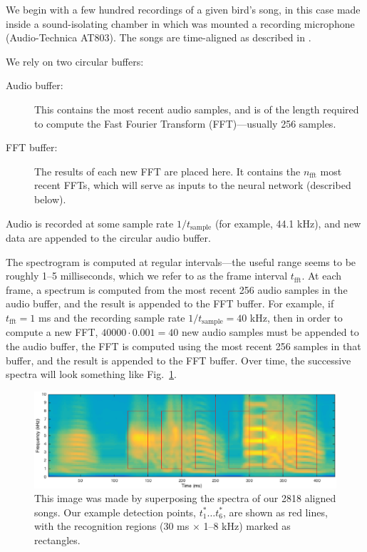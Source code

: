 \documentclass[10pt,letterpaper]{article}
\newcommand\fig[1]{Fig.~\ref{#1}}
\begin{document}
We begin with a few hundred recordings of a given bird's song, in this
case made inside a sound-isolating chamber in which was mounted a
recording microphone (Audio-Technica AT803).  The songs are
time-aligned as described in \cite{Poole2012}.

We rely on two circular buffers:
\begin{description}
\item[Audio buffer:] This contains the most recent audio samples, and
  is of the length required to compute the Fast Fourier Transform
  (FFT)---usually 256 samples.
\item[FFT buffer:] The results of each new FFT are placed here.  It
  contains the $n_\textrm{fft}$ most recent FFTs, which will serve as
  inputs to the neural network (described below).
\end{description}

Audio is recorded at some sample rate $1/t_\mathrm{sample}$ (for example, 44.1 kHz), and new data are appended to the circular audio buffer.

The spectrogram is computed at regular intervals---the useful range
seems to be roughly 1--5 milliseconds, which we refer to as the frame
interval $t_\textrm{fft}$.  At each frame, a spectrum is computed from
the most recent 256 audio samples in the audio buffer, and the result
is appended to the FFT buffer.  For example, if $t_\textrm{fft}=1$ ms
and the recording sample rate $1/t_\textrm{sample}=40$ kHz, then in
order to compute a new FFT, $40000\cdot 0.001=40$ new audio samples
must be appended to the audio buffer, the FFT is computed using the
most recent 256 samples in that buffer, and the result is appended to
the FFT buffer.  Over time, the successive spectra will look something
like \fig{fig:song}.

\begin{figure}
  \includegraphics[width=\textwidth]{Fig1}
  \caption{This image was made by superposing the spectra of our 2818
    aligned songs.  Our example detection points, $t^*_1\ldots t^*_6$,
    are shown as red lines, with the recognition regions (30 ms
    $\times$ 1--8 kHz) marked as rectangles.}
  \label{fig:song}
\end{figure}
\end{document}
